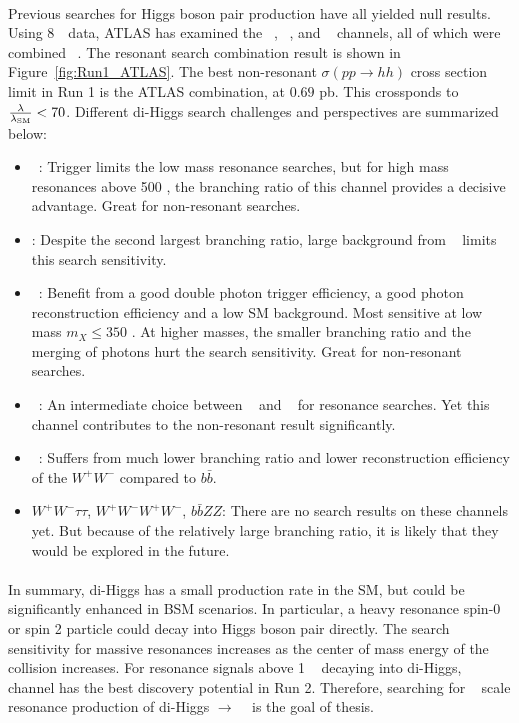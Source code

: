 \paragraph{}
Previous searches for Higgs boson pair production have all yielded null results. Using 8~\TeV\ data, ATLAS has examined the \bbbb~\cite{Aad:2015uka}, \bbgg~\cite{HIGG-2013-29}, \bbtautau and \WWgg~ channels, all of which were combined ~\cite{Aad:2015xja}. The resonant search combination result is shown in Figure~\ref{fig:Run1_ATLAS}. The best non-resonant $\sigma(pp \to hh)$ cross section limit in Run 1 is the ATLAS combination, at $0.69$ pb. This crossponds to $\frac{\rm \lambda}{\rm \lambda_{\rm SM}} <70$. Different di-Higgs search challenges and perspectives are summarized below:
\begin{itemize}
	\item \bbbb~: Trigger limits the low mass resonance searches, but for high mass resonances above 500 \GeV, the branching ratio of this channel provides a decisive advantage. Great for non-resonant searches.
	\item \bbWW: Despite the second largest branching ratio, large background from \ttbar~ limits this search sensitivity.
	\item \bbgg~: Benefit from a good double photon trigger efficiency, a good photon reconstruction efficiency and a low SM background. Most sensitive at low mass $m_{X} \leq 350$ \GeV. At higher masses, the smaller branching ratio and the merging of photons hurt the search sensitivity. Great for non-resonant searches.
	\item \bbtautau~: An intermediate choice between \bbbb~ and \bbgg~ for resonance searches. Yet this channel contributes to the non-resonant result significantly.
	\item \WWgg~: Suffers from much lower branching ratio and lower reconstruction efficiency of the $W^+W^-$ compared to $b\bar{b}$.
	\item $W^+W^-\tau\tau$, $W^+W^-W^+W^-$, $b\bar{b}ZZ$: There are no search results on these channels yet. But because of the relatively large branching ratio, it is likely that they would be explored in the future.
\end{itemize}

\paragraph{}
In summary, di-Higgs has a small production rate in the SM, but could be significantly enhanced in BSM scenarios. In particular, a heavy resonance spin-0 or spin 2 particle could decay into Higgs boson pair directly. The search sensitivity for massive resonances increases as the center of mass energy of the collision increases. For resonance signals above 1 \TeV~ decaying into di-Higgs, \bbbb~ channel has the best discovery potential in Run 2. Therefore, searching for \TeV~ scale resonance production of di-Higgs $\to$ \bbbb~ is the goal of thesis.


